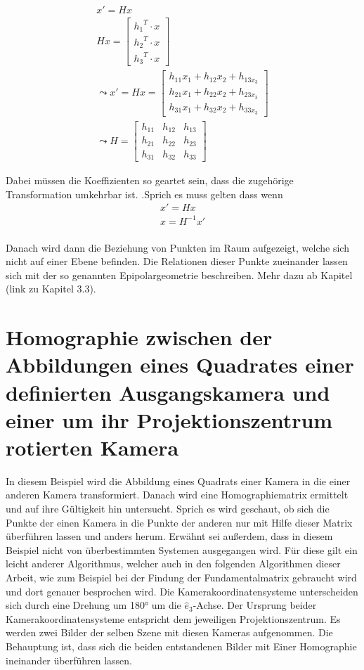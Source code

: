 \begin{gather}
	x' = Hx\\
	Hx = \begin{bmatrix}
	{h_1}^T \cdot x\\{h_2}^T \cdot x\\{h_3}^T \cdot x
	\end{bmatrix} \\
	\leadsto 
	x'= Hx= \begin{bmatrix}
	h_{11}x_1+h_{12}x_2+h_{13x_3}\\
	h_{21}x_1+h_{22}x_2+h_{23x_3}\\
	h_{31}x_1+h_{32}x_2+h_{33x_3}
	\end{bmatrix}\\
	\leadsto 
	H=\begin{bmatrix}
	h_{11}&h_{12}&h_{13}\\
	h_{21}&h_{22}&h_{23}\\
	h_{31}&h_{32}&h_{33}
	\end{bmatrix}
\end{gather}

Dabei müssen die Koeffizienten so geartet sein, dass die zugehörige Transformation umkehrbar ist. \cite{HZ}\cite{Peiffer}.Sprich es muss gelten dass wenn 
\begin{gather}
	x'=Hx\\
	x= H^{-1}x'
\end{gather}\\

Danach wird dann die Beziehung von Punkten im Raum aufgezeigt, welche sich nicht auf einer Ebene befinden. Die Relationen dieser Punkte zueinander lassen sich mit der so genannten Epipolargeometrie beschreiben. Mehr dazu ab Kapitel (link zu Kapitel 3.3).




\section{Homographie zwischen der Abbildungen eines Quadrates einer definierten Ausgangskamera und einer um ihr Projektionszentrum rotierten Kamera}

In diesem Beispiel wird die Abbildung eines Quadrats einer Kamera in die einer anderen Kamera transformiert. Danach wird eine Homographiematrix ermittelt und auf ihre Gültigkeit hin untersucht. Sprich es wird geschaut, ob sich die Punkte der einen Kamera in die Punkte der anderen nur mit Hilfe dieser Matrix überführen lassen und anders herum. Erwähnt sei außerdem, dass in diesem Beispiel nicht von überbestimmten Systemen ausgegangen wird. Für diese gilt ein leicht anderer Algorithmus, welcher auch in den folgenden Algorithmen dieser Arbeit, wie zum Beispiel bei der Findung der Fundamentalmatrix gebraucht wird und dort genauer besprochen wird.
Die Kamerakoordinatensysteme unterscheiden sich durch eine Drehung um 180° um die \ensuremath{\hat{e}_3}-Achse. Der Ursprung beider Kamerakoordinatensysteme entspricht dem jeweiligen Projektionszentrum. Es werden zwei Bilder der selben Szene mit diesen Kameras aufgenommen. Die Behauptung ist, dass sich die beiden entstandenen Bilder mit Einer Homographie ineinander überführen lassen. 

